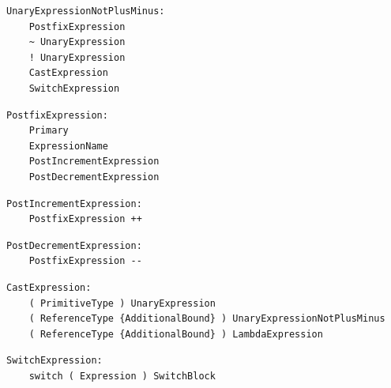 \noindent\textbf{\texttt{}}\par
\begin{lstlisting}
UnaryExpressionNotPlusMinus:
    PostfixExpression
    ~ UnaryExpression
    ! UnaryExpression
    CastExpression
    SwitchExpression
\end{lstlisting}

\noindent\textbf{\texttt{}}\par
\begin{lstlisting}
PostfixExpression:
    Primary
    ExpressionName
    PostIncrementExpression
    PostDecrementExpression
\end{lstlisting}

\noindent\textbf{\texttt{}}\par
\begin{lstlisting}
PostIncrementExpression:
    PostfixExpression ++
\end{lstlisting}

\noindent\textbf{\texttt{}}\par
\begin{lstlisting}
PostDecrementExpression:
    PostfixExpression --
\end{lstlisting}

\noindent\textbf{\texttt{}}\par
\begin{lstlisting}
CastExpression:
    ( PrimitiveType ) UnaryExpression
    ( ReferenceType {AdditionalBound} ) UnaryExpressionNotPlusMinus
    ( ReferenceType {AdditionalBound} ) LambdaExpression
\end{lstlisting}

\noindent\textbf{\texttt{}}\par
\begin{lstlisting}
SwitchExpression:
    switch ( Expression ) SwitchBlock
\end{lstlisting}

